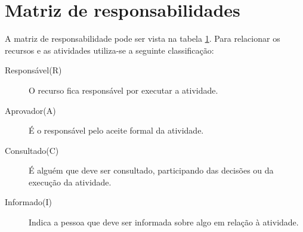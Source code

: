 \chapter{Matriz de responsabilidades}
\label{raci-matrix}

A matriz de responsabilidade pode ser vista na tabela \ref{raci-matrix}. Para relacionar os recursos e as atividades utiliza-se a seguinte classificação:

\begin{description}
	\item[Responsável(R)] O recurso fica responsável por executar a atividade.
	\item[Aprovador(A)] É o responsável pelo aceite formal da atividade.
	\item[Consultado(C)] É alguém que deve ser consultado, participando das decisões ou da execução da atividade.
	\item[Informado(I)] Indica a pessoa que deve ser informada sobre algo em relação à atividade.
\end{description}

